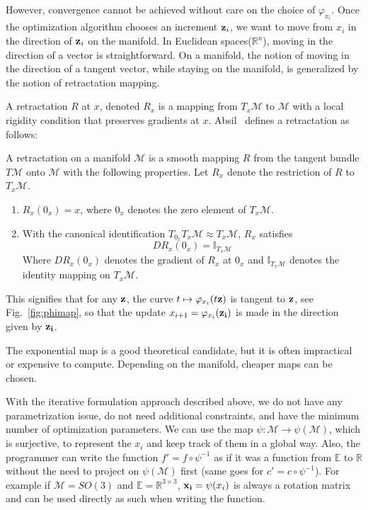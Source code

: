 However, convergence cannot be achieved without care on the choice of $\varphi_{x_i}$.
Once the optimization algorithm chooses an increment ${\bf z}_i$, we want to move from $x_i$ in the direction of ${\bf z}_i$ on the manifold.
In Euclidean spaces($\mathbb{R}^n$), moving in the direction of a vector is straightforward.
On a manifold, the notion of moving in the direction of a tangent vector, while staying on the manifold, is generalized by the notion of retractation mapping.

A retractation $R$ at $x$, denoted $R_x$ is a mapping from $T_x{\mathcal{M}}$ to $\mathcal{M}$ with a local rigidity condition that preserves gradients at $x$.
Absil~\cite{absil:book:2008} defines a retractation as follows:
\begin{definition}
A retractation on a manifold $\mathcal{M}$ is a smooth mapping $R$ from the tangent bundle $T\mathcal{M}$ onto $\mathcal{M}$ with the following properties.
Let $R_x$ denote the restriction of $R$ to $T_x\mathcal{M}$.
\begin{enumerate}
  \item $R_x(0_x) = x$, where $0_x$ denotes the zero element of $T_x\mathcal{M}$.
  \item With the canonical identification $T_{0_x}T_x\mathcal{M}\approx T_x\mathcal{M}$, $R_x$ satisfies
  \begin{equation}
    DR_x(0_x) = \mathbb{I}_{T_x\mathcal{M}}
  \end{equation}
  Where $DR_x(0_x)$ denotes the gradient of $R_x$ at $0_x$ and $\mathbb{I}_{T_x\mathcal{M}}$ denotes the identity mapping on $T_x\mathcal{M}$.
\end{enumerate}
\end{definition}

This signifies that for any ${\bf z}$, the curve $t \mapsto \varphi_{x_i}(t{\bf z})$ is tangent to ${\bf z}$, see Fig.~\ref{fig:phimap}, so that the update $x_{i+1} = \varphi_{x_i}({\bf z_i})$ is made in the direction given by ${\bf z_i}$.

The exponential map is a good theoretical candidate, but it is often impractical or expensive to compute.
Depending on the manifold, cheaper maps can be chosen.

With the iterative formulation approach described above, we do not have any parametrization issue, do not need additional constraints, and have the minimum number of optimization parameters.
We can use the map $\psi:\mathcal{M} \rightarrow \psi(\mathcal{M})$, which is surjective, to represent the $x_i$ and keep track of them in a global way.
Also, the programmer can write the function $f' = f \circ \psi^{-1}$ as if it was a function from $\mathbb{E}$ to $\mathbb{R}$ without the need to project on $\psi(\mathcal{M})$ first (same goes for $c' = c \circ \psi^{-1}$).
For example if $\mathcal{M} = SO(3)$ and $\mathbb{E} = \mathbb{R}^{3\times 3}$, ${\bf x_i}=\psi(x_i)$ is always a rotation matrix and can be used directly as such when writing the function.

